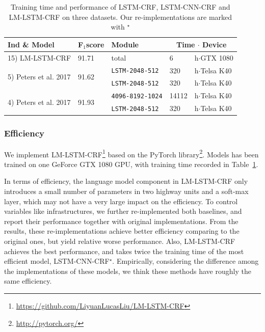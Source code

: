 \documentclass[letterpaper]{article} %
\newcommand{\our}{\textsc{LM-LSTM-CRF}\xspace}
\newcommand{\sbef}{}
\begin{document}
\begin{table}
\center
\scalebox{0.65}
{
\begin{tabular}{l|l|l|l l}
\hline
Ind \& Model & F$_1$score & Module &\multicolumn{2}{|c}{Time $\cdot$ Device}\\
\hline
\hline
15) \our & 91.71 & total & 6 &h$\cdot$GTX 1080\\
\hline
\multirow{2}{*}{5) Peters et al. 2017} & \multirow{2}{*}{91.62} & \texttt{LSTM-2048-512} & 320 & h$\cdot$Telsa K40\\
\cline{3-5}
& & \texttt{LSTM-2048-512}& 320 &h$\cdot$Telsa K40\\
\hline
\multirow{2}{*}{4) Peters et al. 2017} & \multirow{2}{*}{91.93} & \texttt{4096-8192-1024} & 14112 &h$\cdot$Telsa K40\\
\cline{3-5}
& & \texttt{LSTM-2048-512}& 320 &h$\cdot$Telsa K40\\
\hline
\end{tabular}
}
\caption{Training time and performance of LSTM-CRF, LSTM-CNN-CRF and \our on three datasets. Our re-implementations are marked with $^\star$}\label{tbl:eff1}
\end{table}


    \subsubsection{Efficiency}

    We implement LM-LSTM-CRF\footnote{\url{https://github.com/LiyuanLucasLiu/LM-LSTM-CRF}} based on the PyTorch library\footnote{\url{http://pytorch.org/}}. 
    Models has been trained on one GeForce GTX 1080 GPU, with training time recorded in Table~\ref{tbl:eff1}.

    In terms of efficiency, the language model component in \our only introduces a small number of parameters in two highway units and a soft-max layer, which may not have a very large impact on the efficiency.
    To control variables like infrastructures, we further re-implemented both baselines, and report their performance together with original implementations.
    From the results, these re-implementations achieve better efficiency comparing to the original ones, but yield relative worse performance.
    Also, \our achieves the best performance, and takes twice the training time of the most efficient model, LSTM-CNN-CRF$^\star$.
    Empirically, considering the difference among the implementations of these models, we think these methods have roughly the same efficiency.
    
\end{document}
